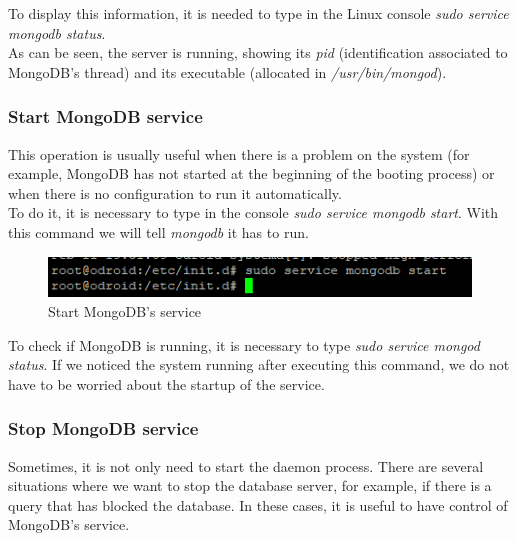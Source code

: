 To display this information, it is needed to type in the Linux console \textit{sudo service mongodb status}.\\

As can be seen, the server is running, showing its \textit{pid} (identification associated to MongoDB’s thread) and its executable (allocated in \textit{/usr/bin/mongod}).\\

\subsubsection{Start MongoDB service}

This operation is usually useful when there is a problem on the system (for example, MongoDB has not started at the beginning of the booting process) or when there is no configuration to run it automatically.\\

To do it, it is necessary to type in the console \textit{sudo service mongodb start}. With this command we will tell \textit{mongodb} it has to run.\\

\begin{figure}[H]
\begin{centering}
\includegraphics[scale=1]{IMGS/start_mongodb_service.PNG}
\caption{Start MongoDB's service \label{Start MongoDB's service}}
\end{centering}
\end{figure}
 
To check if MongoDB is running, it is necessary to type \textit{sudo service mongod status}. If we noticed the system running after executing this command, we do not have to be worried about the startup of the service.

\subsubsection{Stop MongoDB service}

Sometimes, it is not only need to start the daemon process. There are several situations where we want to stop the database server, for example, if there is a query that has blocked the database. In these cases, it is useful to have control of MongoDB’s service.\\

